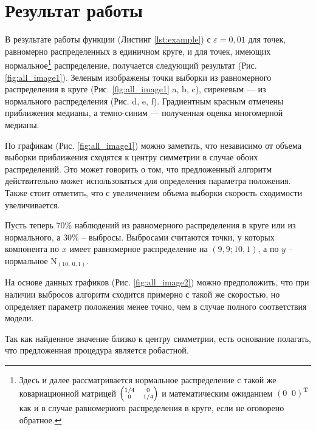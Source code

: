 \documentclass[specialist,
substylefile = spbu.rtx,
               subf,href,colorlinks=true, 12pt]{disser}
\begin{document}
\section{Результат работы}

В результате работы функции (Листинг \ref{lst:example}) с $\varepsilon = 0{,}01$ для точек, равномерно распределенных в единичном круге, и для точек, имеющих  нормальное\footnote{Здесь и далее рассматривается нормальное распределение с такой же ковариационной матрицей $\scriptsize \begin{pmatrix}
1/4 & 0  \\
0 & 1/4
\end{pmatrix} $ и математическим ожиданием $(0 \;\;  0)^{\mathbf{T}}$ как и в случае равномерного распределения в круге, если не оговорено обратное.} распределение, получается следующий результат (Рис. \ref{fig:all_image1}). Зеленым изображены точки выборки из равномерного распределения в круге (Рис. \ref{fig:all_image1} a, b, c), сиреневым --- из нормального распределения (Рис. d, e, f). Градиентным красным отмечены приближения медианы, а темно-синим --- полученная оценка многомерной медианы. 

По графикам (Рис. \ref{fig:all_image1}) можно заметить, что независимо от объема выборки приближения сходятся к центру симметрии в случае обоих распределений. Это может говорить о том, что предложенный алгоритм действительно может использоваться для определения параметра положения. Также стоит отметить, что с увеличением объема выборки скорость сходимости увеличивается. 

Пусть теперь $70\%$ наблюдений из равномерного распределения в круге или из нормального, а  $30\%$ -- выбросы. Выбросами считаются точки, у которых компонента по $x$ имеет равномерное распределение на $(9{,}9; 10{,}1)$, а по $y$ -- нормальное  $\mathrm{N}_{(10,\ 0{,}1)}$. 


На основе данных графиков (Рис. \ref{fig:all_image2}) можно предположить, что при наличии выбросов алгоритм сходится примерно с такой же скоростью, но определяет параметр положения менее точно, чем в случае полного соответствия модели. 

Так как найденное значение близко к центру симметрии, есть основание полагать, что предложенная процедура является робастной.
\end{document}
